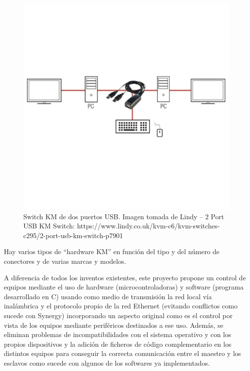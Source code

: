 \begin{figure}
\centering
\includegraphics[scale = 0.5]{capitulo_01/figuras_dir/KMSwitch.jpg}
\caption{Switch KM de dos puertos USB. Imagen tomada de Lindy – 2 Port USB KM Switch: https://www.lindy.co.uk/kvm-c6/kvm-switches-c295/2-port-usb-km-switch-p7901}
\label{fig:switchKM}
\end{figure}

Hay varios tipos de ``hardware KM'' en función del tipo y del número de conectores y de varias marcas y modelos.

A diferencia de todos los inventos existentes, este proyecto propone un control de equipos mediante el uso de hardware (microcontroladoras) y software (programa desarrollado en C) usando como medio de transmisión la red local vía inalámbrica y el protocolo propio de la red Ethernet (evitando conflictos como sucede con Synergy) incorporando un aspecto original como es el control por vista de los equipos mediante periféricos destinados a ese uso. Además, se eliminan problemas de incompatibilidades con el sistema operativo y con los propios dispositivos y la adición de ficheros de código complementario en los distintos equipos para conseguir la correcta comunicación entre el maestro y los esclavos como sucede con algunos de los softwares ya implementados.
\clearpage
